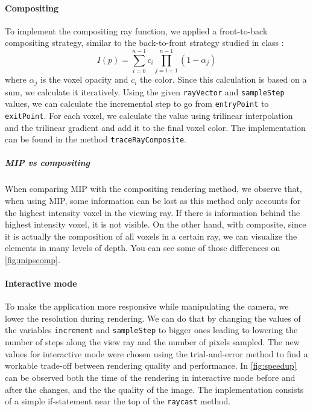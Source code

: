 \documentclass[a4paper]{article}
\begin{document}
\paragraph{Compositing}
\label{ray_composite}

To implement the compositing ray function, we applied a front-to-back compositing strategy, similar to the back-to-front strategy studied in class \citep{2imv20_2}:
$$I(p)=\sum^{n-1}_{i=0}c_i\prod^{n-1}_{j=i+1}(1-\alpha_j)$$
where $\alpha_j$ is the voxel opacity and $c_i$ the color. Since this calculation is based on a sum, we calculate it iteratively. Using the given {\tt rayVector} and {\tt sampleStep} values, we can calculate the incremental step to go from {\tt entryPoint} to {\tt exitPoint}. For each voxel, we calculate the value using trilinear interpolation and the trilinear gradient and add it to the final voxel color. The implementation can be found in the method {\tt traceRayComposite}.

\subparagraph{MIP vs compositing}

When comparing MIP with the compositing rendering method, we observe that, when using MIP, some information can be lost as this method only accounts for the highest intensity voxel in the viewing ray. If there is information behind the highest intensity voxel, it is not visible. On the other hand, with composite, since it is actually the composition of all voxels in a certain ray, we can visualize the elements in many levels of depth. You can see some of those differences on \autoref{fig:mipscomp}.

\paragraph{Interactive mode}
\label{speed_up}

To make the application more responsive while manipulating the camera, we lower the resolution during rendering. We can do that by changing the values of the variables {\tt increment} and {\tt sampleStep} to bigger ones leading to lowering the number of steps along the view ray and the number of pixels sampled.  The new values for interactive mode were chosen using the trial-and-error method to find a workable trade-off between rendering quality and performance. In \autoref{fig:speedup} can be observed both the time of the rendering in interactive mode before and after the changes, and the the quality of the image. The implementation consists of a simple if-statement near the top of the {\tt raycast} method.
\end{document}
